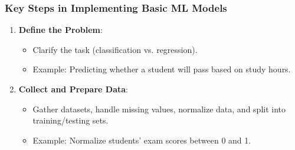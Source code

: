 \documentclass[aspectratio=169]{beamer}
\begin{document}
\begin{frame}[fragile]
    \frametitle{Key Steps in Implementing Basic ML Models}
    \begin{enumerate}
        \item \textbf{Define the Problem}:
        \begin{itemize}
            \item Clarify the task (classification vs. regression).
            \item Example: Predicting whether a student will pass based on study hours.
        \end{itemize}

        \item \textbf{Collect and Prepare Data}:
        \begin{itemize}
            \item Gather datasets, handle missing values, normalize data, and split into training/testing sets.
            \item Example: Normalize students' exam scores between 0 and 1.
        \end{itemize}
    \end{enumerate}
\end{frame}
\end{document}
